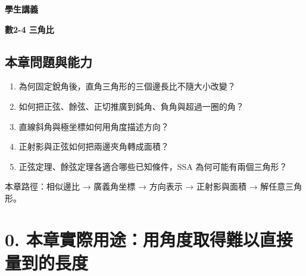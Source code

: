 \documentclass[11pt,a4paper]{article}
\providecommand{\tightlist}{%
  \setlength{\itemsep}{0pt}\setlength{\parskip}{0pt}}
\begin{document}
\begin{tcolorbox}[
  enhanced,colback=white,colframe=HandoutBlue,boxrule=1.1pt,arc=2mm,
  borderline west={3pt}{0pt}{HandoutBlue},left=5mm,right=4mm,top=4mm,bottom=4mm
]
{\sffamily\small\bfseries\color{HandoutBlue}學生講義}\par
{\sffamily\bfseries\LARGE\color{HandoutInk}數2-4 三角比}\par
\vspace{0.35em}{\large 從相似三角形與坐標定義建立三角測量、面積與解三角形的方法}\par
{}\par
{}\par
\end{tcolorbox}


\begin{HandoutLearningMap}

\subsection{本章問題與能力}\label{ux672cux7ae0ux554fux984cux8207ux80fdux529b}

\begin{enumerate}
\def\labelenumi{\arabic{enumi}.}
\tightlist
\item
  為何固定銳角後，直角三角形的三個邊長比不隨大小改變？
\item
  如何把正弦、餘弦、正切推廣到鈍角、負角與超過一圈的角？
\item
  直線斜角與極坐標如何用角度描述方向？
\item
  正射影與正弦如何把兩邊夾角轉成面積？
\item
  正弦定理、餘弦定理各適合哪些已知條件，SSA 為何可能有兩個三角形？
\end{enumerate}

本章路徑：相似邊比 → 廣義角坐標 → 方向表示 → 正射影與面積 → 解任意三角形。

\end{HandoutLearningMap}

\section{0. 本章實際用途：用角度取得難以直接量到的長度}\label{ux672cux7ae0ux5be6ux969bux7528ux9014ux7528ux89d2ux5ea6ux53d6ux5f97ux96e3ux4ee5ux76f4ux63a5ux91cfux5230ux7684ux9577ux5ea6}
\end{document}
